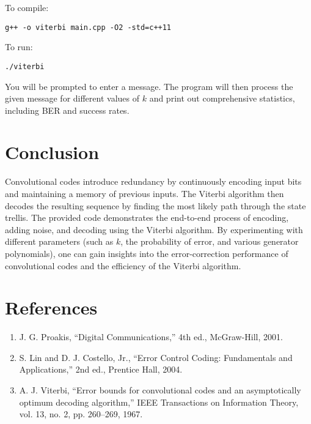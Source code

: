 \documentclass[12pt,a4paper]{article}
\begin{document}
To compile:
\begin{verbatim}
g++ -o viterbi main.cpp -O2 -std=c++11
\end{verbatim}

To run:
\begin{verbatim}
./viterbi
\end{verbatim}

You will be prompted to enter a message. The program will then process the given message for different values of $k$ and print out comprehensive statistics, including BER and success rates.

\section{Conclusion}

Convolutional codes introduce redundancy by continuously encoding input bits and maintaining a memory of previous inputs. The Viterbi algorithm then decodes the resulting sequence by finding the most likely path through the state trellis. The provided code demonstrates the end-to-end process of encoding, adding noise, and decoding using the Viterbi algorithm. By experimenting with different parameters (such as $k$, the probability of error, and various generator polynomials), one can gain insights into the error-correction performance of convolutional codes and the efficiency of the Viterbi algorithm.

\section*{References}

\begin{enumerate}
    \item J. G. Proakis, ``Digital Communications,'' 4th ed., McGraw-Hill, 2001.
    \item S. Lin and D. J. Costello, Jr., ``Error Control Coding: Fundamentals and Applications,'' 2nd ed., Prentice Hall, 2004.
    \item A. J. Viterbi, ``Error bounds for convolutional codes and an asymptotically optimum decoding algorithm,'' IEEE Transactions on Information Theory, vol. 13, no. 2, pp. 260--269, 1967.
\end{enumerate}
\end{document}
